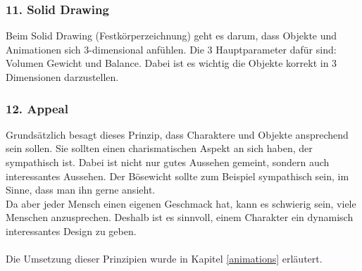 \subsubsection{11. Solid Drawing}
Beim Solid Drawing (Festkörperzeichnung) geht es darum, dass Objekte und Animationen sich 3-dimensional anfühlen.
Die 3 Hauptparameter dafür sind: Volumen Gewicht und Balance. Dabei ist es wichtig die Objekte korrekt in 3 Dimensionen darzustellen.

\subsubsection{12. Appeal}
Grundsätzlich besagt dieses Prinzip, dass Charaktere und Objekte ansprechend sein sollen. Sie sollten einen charismatischen
Aspekt an sich haben, der sympathisch ist. Dabei ist nicht nur gutes Aussehen gemeint, sondern auch interessantes Aussehen. Der Bösewicht sollte zum Beispiel sympathisch sein, im Sinne, dass man ihn gerne ansieht. \\
Da aber jeder Mensch einen eigenen Geschmack hat, kann es schwierig sein, viele Menschen anzusprechen. Deshalb ist es sinnvoll, einem Charakter ein dynamisch interessantes Design zu geben. \\
\\
Die Umsetzung dieser Prinzipien wurde in Kapitel \ref{animations} erläutert.